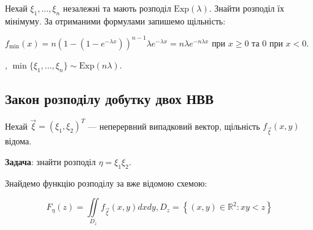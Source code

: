 \begin{example}
    Нехай $\xi_1, ..., \xi_n$ незалежні та мають розподіл $\mathrm{Exp}(\lambda)$. Знайти розподіл їх мінімуму.
    За отриманими формулами запишемо щільність:

    $f_{\min}(x) = n (1-(1-e^{-\lambda x}))^{n-1} \lambda e^{-\lambda x} = n \lambda e^{-n\lambda x}$ при $x \geq 0$ та $0$ при $x < 0$.
    
    , $\min\{\xi_1, ..., \xi_n\} \sim \mathrm{Exp} (n \lambda)$.
\end{example}

\subsection{Закон розподілу добутку двох НВВ}
Нехай $\vec{\xi} = (\xi_1, \xi_2)^T$ --- неперервний випадковий вектор, щільність
$f_{\vec{\xi}}(x, y)$ відома.

\noindent\textbf{Задача}: знайти розподіл $\eta = \xi_1\xi_2$.

Знайдемо функцію розподілу за вже відомою схемою:

$$F_\eta(z) = \iint\limits_{D_z}f_{\vec{\xi}}(x, y)dx dy, D_z = \left\{(x, y) \in 
\mathbb{R}^2 : xy < z\right\}$$

